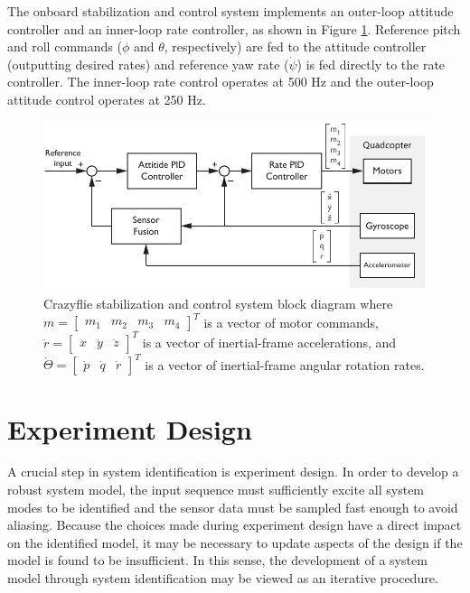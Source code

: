 The onboard stabilization and control system implements an outer-loop attitude controller and an inner-loop rate controller, as shown in Figure \ref{fig:control_system_block_diagram}. Reference pitch and roll commands ($\phi$ and $\theta$, respectively) are fed to the attitude controller (outputting desired rates) and reference yaw rate ($\dot\psi$) is fed directly to the rate controller. The inner-loop rate control operates at 500 Hz and the outer-loop attitude control operates at 250 Hz.
\begin{figure}[htb!]
	\centering
	\includegraphics{../fig/crazyflie_control_system_block_diagram.pdf}
	\caption[Crazyflie stabilization and control system block diagram.]{Crazyflie stabilization and control system block diagram where $m = \begin{bmatrix}m_1 & m_2 & m_3 & m_4\end{bmatrix}^T$ is a vector of motor commands, $\ddot{r} = \begin{bmatrix}\ddot{x}&\ddot{y}&\ddot{z}\end{bmatrix}^T$ is a vector of inertial-frame accelerations, and $\dot\Theta = \begin{bmatrix}\dot{p}&\dot{q}&\dot{r}\end{bmatrix}^T$ is a vector of inertial-frame angular rotation rates.}
	\label{fig:control_system_block_diagram}
\end{figure}


\section{Experiment Design}
A crucial step in system identification is experiment design. In order to develop a robust system model, the input sequence must sufficiently excite all system modes to be identified and the sensor data must be sampled fast enough to avoid aliasing. Because the choices made during experiment design have a direct impact on the identified model, it may be necessary to update aspects of the design if the model is found to be insufficient. In this sense, the development of a system model through system identification may be viewed as an iterative procedure.

